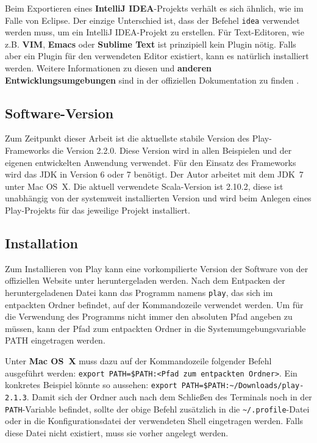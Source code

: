 Beim Exportieren eines \textbf{IntelliJ IDEA}-Projekts verhält es sich ähnlich, wie im Falle von Eclipse.
Der einzige Unterschied ist, dass der Befehel \lstinline|idea| verwendet werden muss, um ein IntelliJ IDEA-Projekt zu erstellen.
Für Text-Editoren, wie z.B. \textbf{VIM}, \textbf{Emacs} oder \textbf{Sublime Text} ist prinzipiell kein Plugin nötig.
Falls aber ein Plugin für den verwendeten Editor existiert, kann es natürlich installiert werden.
Weitere Informationen zu diesen und \textbf{anderen Entwicklungsumgebungen} sind in der offiziellen Dokumentation zu finden \cite[vgl.][]{ide}.



\subsection{Software-Version} %
\label{sub:software_version}

Zum Zeitpunkt dieser Arbeit ist die aktuellste stabile Version des Play-Frameworks die Version 2.2.0.
Diese Version wird in allen Beispielen und der eigenen entwickelten Anwendung verwendet.
Für den Einsatz des Frameworks wird das JDK in Version 6 oder 7 benötigt.
Der Autor arbeitet mit dem JDK~7 unter Mac OS~X.
Die aktuell verwendete Scala-Version ist 2.10.2, diese ist unabhängig von der systemweit installierten Version und wird beim Anlegen eines Play-Projekts für das jeweilige Projekt installiert.



\subsection{Installation} %
\label{sub:installation}

Zum Installieren von Play kann eine vorkompilierte Version der Software von der offiziellen Website unter \cite{play_download} heruntergeladen werden.
Nach dem Entpacken der heruntergeladenen Datei kann das Programm namens \lstinline|play|, das sich im entpackten Ordner befindet, auf der Kommandozeile verwendet werden.
Um für die Verwendung des Programms nicht immer den absoluten Pfad angeben zu müssen, kann der Pfad zum entpackten Ordner in die Systemumgebungsvariable PATH eingetragen werden.

Unter \textbf{Mac OS~X} muss dazu auf der Kommandozeile folgender Befehl ausgeführt werden: \lstinline|export PATH=$PATH:<Pfad zum entpackten Ordner>|.
Ein konkretes Beispiel könnte so aussehen: \lstinline|export PATH=$PATH:~/Downloads/play-2.1.3|.
Damit sich der Ordner auch nach dem Schließen des Terminals noch in der \lstinline|PATH|-Variable befindet, sollte der obige Befehl zusätzlich in die \lstinline|~/.profile|-Datei oder in die Konfigurationsdatei der verwendeten Shell eingetragen werden.
Falls diese Datei nicht existiert, muss sie vorher angelegt werden.

